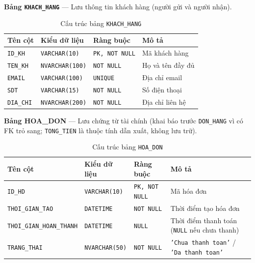 \documentclass[11pt]{report}
\begin{document}
\noindent\textbf{Bảng \texttt{KHACH\_HANG}} --- Lưu thông tin khách hàng (người gửi và người nhận).
\begin{table}[H]
    \centering
    \renewcommand{\tabularxcolumn}[1]{m{#1}}
    \begin{tabularx}{\textwidth}{|l|l|l|X|} \hline
        \rowcolor{teal!30}
        \textbf{Tên cột} & \textbf{Kiểu dữ liệu} & \textbf{Ràng buộc} & \textbf{Mô tả} \\ \hline
        \texttt{ID\_KH}   & \texttt{VARCHAR(10)}   & \texttt{PK, NOT NULL}  & Mã khách hàng \\ \hline
        \texttt{TEN\_KH}  & \texttt{NVARCHAR(100)} & \texttt{NOT NULL}      & Họ và tên đầy đủ \\ \hline
        \texttt{EMAIL}    & \texttt{VARCHAR(100)}  & \texttt{UNIQUE}  & Địa chỉ email \\ \hline
        \texttt{SDT}      & \texttt{VARCHAR(15)}   & \texttt{NOT NULL}      & Số điện thoại \\ \hline
        \texttt{DIA\_CHI} & \texttt{NVARCHAR(200)} & \texttt{NOT NULL}      & Địa chỉ liên hệ \\ \hline
    \end{tabularx}
    \caption{Cấu trúc bảng \texttt{KHACH\_HANG}}
    \label{tab:str_khachhang}
\end{table}

\noindent\textbf{Bảng HOA\_DON} --- Lưu chứng từ tài chính (khai báo trước \texttt{DON\_HANG} vì có FK trỏ sang; \texttt{TONG\_TIEN} là thuộc tính dẫn xuất, không lưu trữ).
\begin{table}[H]
    \centering
    \renewcommand{\tabularxcolumn}[1]{m{#1}}
    \begin{tabularx}{\textwidth}{|l|l|l|>{\raggedright\arraybackslash}X|} \hline
        \rowcolor{teal!30}
        \textbf{Tên cột} & \textbf{Kiểu dữ liệu} & \textbf{Ràng buộc} & \textbf{Mô tả} \\ \hline
        \texttt{ID\_HD}                  & \texttt{VARCHAR(10)}  & \texttt{PK, NOT NULL}  & Mã hóa đơn \\ \hline
        \texttt{THOI\_GIAN\_TAO}         & \texttt{DATETIME}     & \texttt{NOT NULL}      & Thời điểm tạo hóa đơn \\ \hline
        \texttt{THOI\_GIAN\_HOAN\_THANH} & \texttt{DATETIME}     & \texttt{NULL}          & Thời điểm thanh toán (\texttt{NULL} nếu chưa thanh) \\ \hline
        \texttt{TRANG\_THAI}             & \texttt{NVARCHAR(50)} & \texttt{NOT NULL}      & \texttt{'Chua thanh toan'} / \texttt{'Da thanh toan'} \\ \hline
    \end{tabularx}
    \caption{Cấu trúc bảng \texttt{HOA\_DON}}
    \label{tab:str_hoadon}
\end{table}
\end{document}

